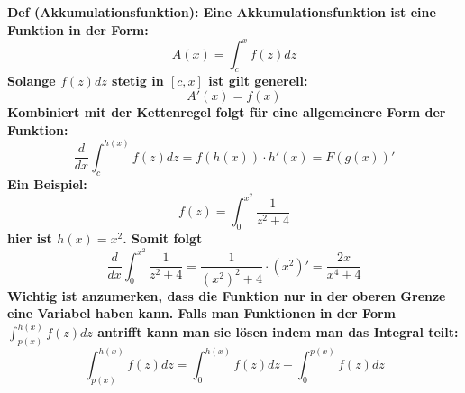 \documentclass[7pt,landscape, margin = 0.1mm]{article}
\newcommand{\DEF}[2]{\color{chaptercolor}\bf{Def #1}:\color{black}    \hspace{0.2cm} #2 \\}
\begin{document}
\begin{multicols}{4}
\begin{flushleft}
\DEF{(Akkumulationsfunktion)}{
Eine Akkumulationsfunktion ist eine Funktion in der Form:
$$ A(x) = \int_{c}^{x} f(z)dz
$$
Solange $f(z)dz$ stetig in $[c,x]$ ist gilt generell: $$A'(x)=f(x) $$
Kombiniert mit der Kettenregel folgt für eine allgemeinere Form der Funktion:
$$\frac{d}{dx} \int_{c}^{h(x)} f(z)dz = f(h(x))\cdot h'(x) = F(g(x))' $$
Ein Beispiel:
$$f(z)=\int_{0}^{x^2} \frac{1}{z^2+4}$$
hier ist $h(x)=x^2$. Somit folgt
$$\frac{d}{dx}\int_{0}^{x^2} \frac{1}{z^2+4} = \frac{1}{(x^2)^2+4}\cdot (x^2)' = \frac{2x}{x^4+4}$$
Wichtig ist anzumerken, dass die Funktion nur in der oberen Grenze eine Variabel haben kann. Falls man Funktionen in der Form $
 \int_{p(x)}^{h(x)} f(z)dz$
 antrifft kann man sie lösen indem man das Integral teilt:
 $$ \int_{p(x)}^{h(x)} f(z)dz = \int_{0}^{h(x)} f(z)dz - \int_{0}^{p(x)} f(z)dz  $$}
 

\end{flushleft}
\end{multicols}
\end{document}
